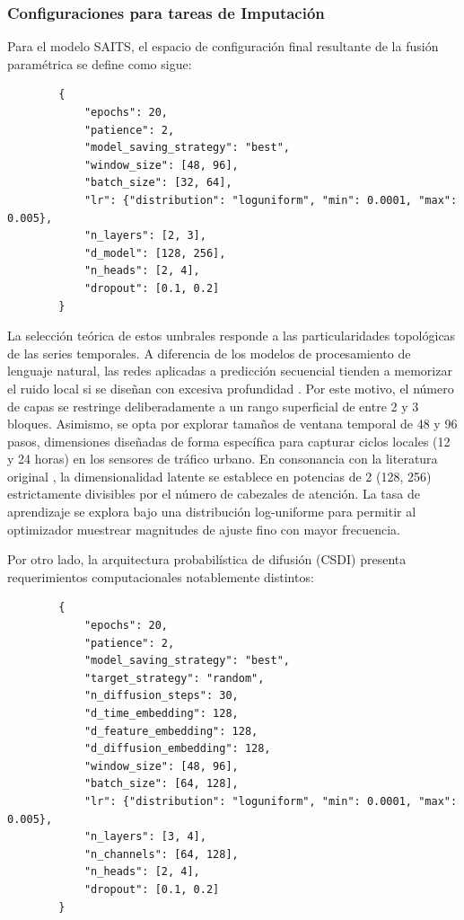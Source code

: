 \subsubsection{Configuraciones para tareas de Imputación}

Para el modelo SAITS, el espacio de configuración final resultante de la fusión paramétrica se define como sigue:

\begin{listing}[H]
	\caption{Espacio de búsqueda y configuración base para la arquitectura SAITS.}
	\label{lst:json_saits}
	\begin{verbatim}
		{
			"epochs": 20,
			"patience": 2,
			"model_saving_strategy": "best",
			"window_size": [48, 96],
			"batch_size": [32, 64],
			"lr": {"distribution": "loguniform", "min": 0.0001, "max": 0.005},
			"n_layers": [2, 3],
			"d_model": [128, 256],
			"n_heads": [2, 4],
			"dropout": [0.1, 0.2]
		}
	\end{verbatim}
\end{listing}

La selección teórica de estos umbrales responde a las particularidades topológicas de las series temporales. A diferencia de los modelos de procesamiento de lenguaje natural, las redes aplicadas a predicción secuencial tienden a memorizar el ruido local si se diseñan con excesiva profundidad \parencite{zeng2023are}. Por este motivo, el número de capas se restringe deliberadamente a un rango superficial de entre 2 y 3 bloques. Asimismo, se opta por explorar tamaños de ventana temporal de 48 y 96 pasos, dimensiones diseñadas de forma específica para capturar ciclos locales (12 y 24 horas) en los sensores de tráfico urbano. En consonancia con la literatura original \parencite{vaswani2017attention}, la dimensionalidad latente se establece en potencias de 2 (128, 256) estrictamente divisibles por el número de cabezales de atención. La tasa de aprendizaje se explora bajo una distribución log-uniforme para permitir al optimizador muestrear magnitudes de ajuste fino con mayor frecuencia.

Por otro lado, la arquitectura probabilística de difusión (CSDI) presenta requerimientos computacionales notablemente distintos:

\begin{listing}[H]
	\caption{Espacio de búsqueda y configuración base para la arquitectura CSDI.}
	\label{lst:json_csdi}
	\begin{verbatim}
		{
			"epochs": 20,
			"patience": 2,
			"model_saving_strategy": "best",
			"target_strategy": "random",
			"n_diffusion_steps": 30,
			"d_time_embedding": 128,
			"d_feature_embedding": 128,
			"d_diffusion_embedding": 128,
			"window_size": [48, 96],
			"batch_size": [64, 128],
			"lr": {"distribution": "loguniform", "min": 0.0001, "max": 0.005},
			"n_layers": [3, 4],
			"n_channels": [64, 128],
			"n_heads": [2, 4],
			"dropout": [0.1, 0.2]
		}
	\end{verbatim}
\end{listing}

